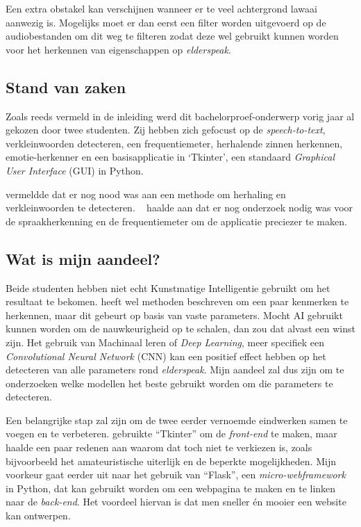 Een extra obstakel kan verschijnen wanneer er te veel achtergrond lawaai aanwezig is. Mogelijks moet er dan eerst een filter worden uitgevoerd op de audiobestanden om dit weg te filteren zodat deze wel gebruikt kunnen worden voor het herkennen van eigenschappen op \textit{elderspeak}.

\subsection{Stand van zaken}\label{subsec:stand-van-zaken}

Zoals reeds vermeld in de inleiding werd dit bachelorproef-onderwerp vorig jaar al gekozen door twee studenten.
Zij hebben zich gefocust op de \textit{speech-to-text}, verkleinwoorden detecteren, een frequentiemeter, herhalende zinnen herkennen, emotie-herkenner en een basisapplicatie in `Tkinter', een standaard \textit{Graphical User Interface} (GUI) in Python.

\textcite{Beeckman2021} vermeldde dat er nog nood was aan een methode om herhaling en verkleinwoorden te detecteren. ~\textcite{Standaert2021} haalde aan dat er nog onderzoek nodig was voor de spraakherkenning en de frequentiemeter om de applicatie preciezer te maken.

\subsection{Wat is mijn aandeel?}\label{subsec:watismijnadeel}

Beide studenten hebben niet echt Kunstmatige Intelligentie gebruikt om het resultaat te bekomen. \textcite{Standaert2021} heeft wel methoden beschreven om een paar kenmerken te herkennen, maar dit gebeurt op basis van vaste parameters.
Mocht AI gebruikt kunnen worden om de nauwkeurigheid op te schalen, dan zou dat alvast een winst zijn.
Het gebruik van Machinaal leren of \textit{Deep Learning}, meer specifiek een \textit{Convolutional Neural Network} (CNN) kan een positief effect hebben op het detecteren van alle parameters rond \textit{elderspeak}. Mijn aandeel zal dus zijn om te onderzoeken welke modellen het beste gebruikt worden om die parameters te detecteren.

Een belangrijke stap zal zijn om de twee eerder vernoemde eindwerken samen te voegen en te verbeteren. \textcite{Beeckman2021} gebruikte ``Tkinter'' om de \textit{front-end} te maken, maar haalde een paar redenen aan waarom dat toch niet te verkiezen is, zoals bijvoorbeeld het amateuristische uiterlijk en de beperkte mogelijkheden.
Mijn voorkeur gaat eerder uit naar het gebruik van ``Flask'', een \textit{micro-webframework} in Python, dat kan gebruikt worden om een webpagina te maken en te linken naar de \textit{back-end}.
Het voordeel hiervan is dat men sneller én mooier een website kan ontwerpen.


